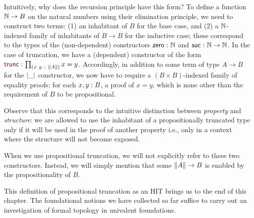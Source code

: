Intuitively, why does the recursion principle have this form? To define a function
$\mathbb{N}{} \rightarrow B$ on the natural numbers using their elimination principle, we need to
construct two terms: (1) an inhabitant of $B$ for the base case, and (2) a
$\mathbb{N}{}$-indexed family of inhabitants of $B \rightarrow B$ for the inductive case; these
correspond to the types of the (non-dependent) constructors $\mathsf{zero}{}\hspace{0.1mm}:\hspace{0.1mm}\mathbb{N}{}$ and
$\mathsf{suc}{}\hspace{0.1mm}:\hspace{0.1mm}\mathbb{N}{} \rightarrow \mathbb{N}{}$. In the case of truncation, we have a (dependent)
constructor of the form $\oftyI{\rulename{trunc}}{\pity{x~y}{\trunc{A}}{x = y}}$.
Accordingly, in addition to some term of type $A \rightarrow B$ for the $\rulename{|}\_\rulename{|}$
constructor, we now have to require a $(B \times B)$-indexed family of equality proofs: for
each $x, y:B$, a proof of $x = y$, which is none other than the requirement of
$B$ to be propositional.

Observe that this corresponds to the intuitive distinction between \emph{property} and
\emph{structure}: we are allowed to use the inhabitant of a propositionally truncated type
only if it will be used in the proof of another property i.e., only in a context where the
structure will not become exposed.

When we use propositional truncation, we will not explicitly refer to these two
constructors. Instead, we will simply mention that some $\left\| A \right\| \rightarrow B$ is enabled by the
propositionality of $B$.

This definition of propositional truncation as an HIT brings us to the end of this
chapter. The foundational notions we have collected so far suffice to carry out an
investigation of formal topology in univalent foundations.
